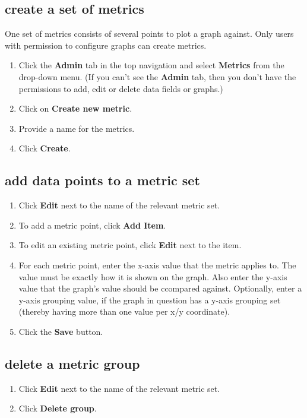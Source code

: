 \documentclass{ctrlo-int-toc}
\begin{document}
\begin{admin}
\subsection[create a set of metrics]{create a set of metrics}
One set of metrics consists of several points to plot a graph against. Only users with permission to configure graphs can create metrics.

\begin{enumerate}
\item Click the \textbf{Admin} tab in the top navigation and select \textbf{Metrics} from the drop-down menu. (If you can't see the \textbf{Admin} tab, then you don't have the permissions to add, edit or delete data fields or graphs.)
\item Click on \textbf{Create new metric}.
\item Provide a name for the metrics.
\item Click \textbf{Create}.
\end{enumerate}
\subsection[add data points to a metric set]{add data points to a metric set}
\begin{enumerate}
\item Click \textbf{Edit} next to the name of the relevant metric set.
\item To add a metric point, click \textbf{Add Item}.
\item To edit an existing metric point, click \textbf{Edit} next to the item.
\item For each metric point, enter the x-axis value that the metric applies to. The value must be exactly how it is shown on the graph. Also enter the y-axis value that the graph's value should be ccompared against. Optionally, enter a y-axis grouping value, if the graph in question has a y-axis grouping set (thereby having more than one value per x/y coordinate).
\item Click the \textbf{Save} button.
\end{enumerate}

\subsection[delete a metric group]{delete a metric group}
\begin{enumerate}
\item Click \textbf{Edit} next to the name of the relevant metric set.
\item Click \textbf{Delete group}.
\end{enumerate}


\end{admin}
\end{document}
